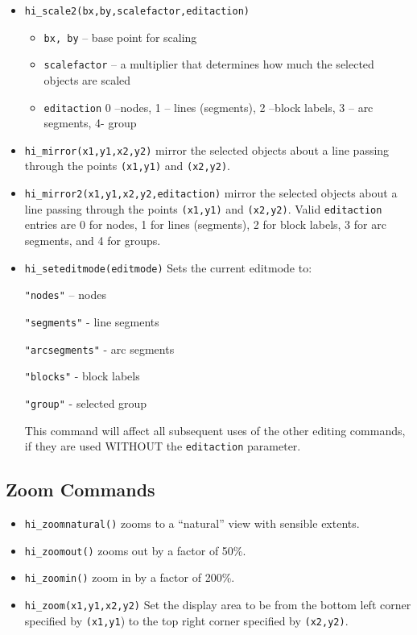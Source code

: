 \begin{itemize}
\item{\tt hi\_scale2(bx,by,scalefactor,editaction)}
        \begin{itemize}
        \item{\tt bx, by} -- base point for scaling
        \item{\tt scalefactor} -- a multiplier that determines how
        much the selected objects are scaled
        \item{\tt editaction}  0 --nodes, 1 -- lines (segments), 2 --block labels, 3 -- arc
                segments, 4- group
        \end{itemize}

\item{\tt hi\_mirror(x1,y1,x2,y2)}
mirror the selected objects about a line passing through the points
{\tt (x1,y1)} and {\tt (x2,y2)}.

\item{\tt hi\_mirror2(x1,y1,x2,y2,editaction)}
mirror the selected objects about a line passing through the points
{\tt (x1,y1)} and {\tt (x2,y2)}. Valid {\tt editaction} entries are
0 for nodes, 1 for lines (segments), 2 for block labels, 3 for arc
segments, and 4 for groups.


\item \texttt{hi\_seteditmode(editmode)} Sets the current editmode to:

\texttt{"nodes"} -- nodes

\texttt{"segments"} - line segments

\texttt{"arcsegments"} - arc segments

\texttt{"blocks"} - block labels

\texttt{"group"} - selected group

This command will affect all subsequent uses of the other editing
commands, if they are used WITHOUT the \texttt{editaction}
parameter.
\end{itemize}

\subsection{Zoom Commands}

\begin{itemize}
\item \texttt{hi\_zoomnatural()} zooms to a ``natural'' view with sensible extents.

\item \texttt{hi\_zoomout()} zooms out by a factor of 50{\%}.

\item \texttt{hi\_zoomin()} zoom in by a factor of 200{\%}.

\item \texttt{hi\_zoom(x1,y1,x2,y2)} Set the display area to be from the bottom left
corner specified by \texttt{(x1,y1}) to the top right corner
specified by \texttt{(x2,y2)}.
\end{itemize}

